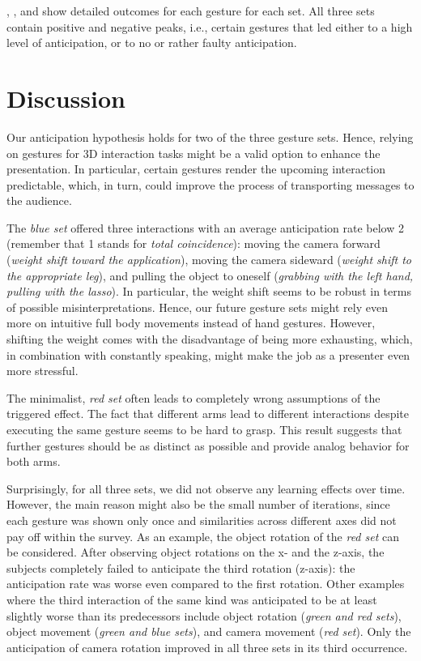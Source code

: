 \documentclass{sigchi}
\begin{document}
, , and  show detailed outcomes for each gesture for each set. All three sets contain positive and negative peaks, i.e., certain gestures that led either to a high level of anticipation, or to no or rather faulty anticipation.



%







\newpage


\section{Discussion}

Our anticipation hypothesis holds for two of the three gesture sets. Hence, relying on gestures for 3D interaction tasks might be a valid option to enhance the presentation. In particular, certain gestures render the upcoming interaction predictable, which, in turn, could improve the process of transporting messages to the audience. 

The \textit{blue set} offered three interactions with an average anticipation rate below 2 (remember that 1 stands for \textit{total coincidence}): moving the camera forward (\textit{weight shift toward the application}), moving the camera sideward (\textit{weight shift to the appropriate leg}), and pulling the object to oneself (\textit{grabbing with the left hand, pulling with the lasso}). In particular, the weight shift seems to be robust in terms of possible misinterpretations. Hence, our future gesture sets might rely even more on intuitive full body movements instead of hand gestures. However, shifting the weight comes with the disadvantage of being more exhausting, which, in combination with constantly speaking, might make the job as a presenter even more stressful.

The minimalist, \textit{red set} often leads to completely wrong assumptions of the triggered effect. The fact that different arms lead to different interactions despite executing the same gesture seems to be hard to grasp. This result suggests that further gestures should be as distinct as possible and provide analog behavior for both arms.

Surprisingly, for all three sets, we did not observe any learning effects over time. However, the main reason might also be the small number of iterations, since each gesture was shown only once and similarities across different axes did not pay off within the survey. As an example, the object rotation of the \textit{red set} can be considered. After observing object rotations on the x- and the z-axis, the subjects completely failed to anticipate the third rotation (z-axis): the anticipation rate was worse even compared to the first rotation. Other examples where the third interaction of the same kind was anticipated to be at least slightly worse than its predecessors include object rotation (\textit{green and red sets}), object movement (\textit{green and blue sets}), and camera movement (\textit{red set}). Only the anticipation of camera rotation improved in all three sets in its third occurrence.
\end{document}
